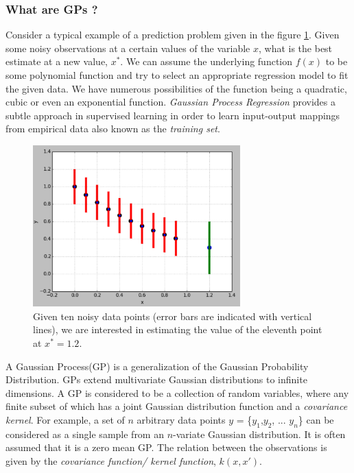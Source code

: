 \documentclass[12pt]{report}
\begin{document}
\subsubsection{What are GPs ?}
Consider a typical example of a prediction problem given in the figure \ref{fig:gp_intro}. Given some noisy observations at a certain values of the variable $x$, what is the best estimate at a new value, $x^*$. We can assume the underlying function $f(x)$ to be some polynomial function and try to select an appropriate regression model to fit the given data. We have numerous possibilities of the function being a quadratic, cubic or even an exponential function. \textit{Gaussian Process Regression} provides a subtle approach in supervised learning in order to learn input-output mappings from empirical data also known as the \textit{training set}. \par 

\begin{figure}[htp]
	\centering 
	\includegraphics[width=8cm]{gp_intro.pdf}
	\caption{Given ten noisy data points (error bars are indicated with vertical lines), we are interested in estimating the value of the eleventh point at $x^* = 1.2$.}
   \label{fig:gp_intro}
\end{figure}

A Gaussian Process(GP) is a generalization of the Gaussian Probability Distribution. GPs extend multivariate Gaussian distributions to infinite dimensions. A GP is considered to be a collection of random variables, where any finite subset of which has a joint Gaussian distribution function and a \textit{covariance kernel}. For example, a set of $n$ arbitrary data points $y$ = \{$y_1$,$y_2$, ... $y_n$\} can be considered as a single sample from an $n$-variate Gaussian distribution. It is often assumed that it is a zero mean GP. The relation between the observations is given by the \textit{covariance function/ kernel function}, $k(x,x')$. 
\end{document}
